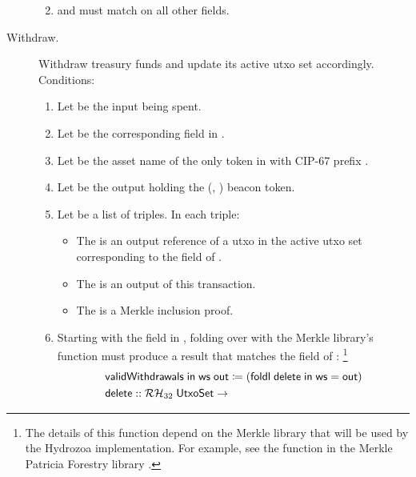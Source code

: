 \documentclass[../hydrozoa.tex]{subfiles}
\begin{document}
\begin{description}
\begin{enumerate}
\begin{enumerate}
        \end{enumerate}
      \item {} and  must match on all other fields.
    \end{enumerate}
  \item[Withdraw.] Withdraw treasury funds and update its active utxo set accordingly.
    Conditions:
    \begin{enumerate}
      \item Let  be the input being spent.
      \item Let  be the corresponding field in .
      \item Let  be the asset name of the only  token in  with CIP-67 prefix .
      \item Let  be the output holding the (, ) beacon token.
      \item Let  be a list of triples. In each triple:
        \begin{itemize}
          \item The  is an output reference of a utxo in the active utxo set corresponding to the  field of .
          \item The  is an output of this transaction.
          \item The  is a Merkle inclusion proof.
        \end{itemize}
      \item Starting with the  field in , folding over  with the Merkle library's  function must produce a result that matches the  field of :%
        \footnote{The details of this function depend on the Merkle library that will be used by the Hydrozoa implementation. For example, see the  function in the Merkle Patricia Forestry library \citep{MatthiasBenkortMerklePatriciaForestry2024}.}
        \begin{equation*}
        \begin{split}
          &\T{validWithdrawals} \; \T{in} \; \T{ws} \; \T{out} \coloneq
            (\T{foldl} \; \T{delete} \; \T{in} \; \T{ws} = \T{out}) \\
          &\T{delete} ::
            \mathcal{RH}_{32} \; \T{UtxoSet} ->

\end{split}
\end{equation*}
\end{enumerate}
\end{description}
\end{document}
